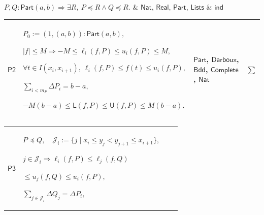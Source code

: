 \documentclass[11pt]{amsart}
\newlength{\FTCFourColumnBody}
\begin{document}
{\begin{tabular}
$\displaystyle P,Q:\textsf{Part}(a,b)\Rightarrow\exists R,\ P\preceq R\land Q\preceq R.$ & \hyperlink{ax:Nat}{$\displaystyle \textsf{Nat}$}, \hyperlink{ax:Real}{$\displaystyle \textsf{Real}$}, \hyperlink{def:Part}{$\displaystyle \textsf{Part}$}, \hyperlink{def:Lists}{$\displaystyle \textsf{Lists}$} & $\displaystyle \textsf{ind}$\\ \hline
\end{tabular}%
\par\setlength{\parskip}{0pt}\nointerlineskip
\noindent
\begin{tabular}{|@{}>{\centering\arraybackslash}m{0.078431\FTCFourColumnBody}|>{\centering\arraybackslash}m{0.535947\FTCFourColumnBody}|>{\centering\arraybackslash}m{0.281045\FTCFourColumnBody}|>{\centering\arraybackslash}m{0.104575\FTCFourColumnBody}|}\hline
\hypertarget{proof:P2}{$\displaystyle \textsf{P2}$} & $\displaystyle P_0:=(1,(a,b)):\textsf{Part}(a,b),$\par
$\displaystyle |f|\le M\Rightarrow -M\le\ell_i(f,P)\le u_i(f,P)\le M,$\par
$\displaystyle \forall t\in I(x_i,x_{i+1}),\ \ell_i(f,P)\le f(t)\le u_i(f,P),$\par
$\displaystyle \sum_{i<m_P}\Delta P_i=b-a,$\par
$\displaystyle -M(b-a)\le\textsf{L}(f,P)\le\textsf{U}(f,P)\le M(b-a).$ & \hyperlink{def:Part}{$\displaystyle \textsf{Part}$}, \hyperlink{def:Darboux}{$\displaystyle \textsf{Darboux}$}, \hyperlink{def:Bdd}{$\displaystyle \textsf{Bdd}$}, \hyperlink{ax:Complete}{$\displaystyle \textsf{Complete}$}, \hyperlink{ax:Nat}{$\displaystyle \textsf{Nat}$} & $\displaystyle \sum$\\ \hline
\end{tabular}%
\par\setlength{\parskip}{0pt}\nointerlineskip
\noindent
\begin{tabular}{|@{}>{\centering\arraybackslash}m{0.078431\FTCFourColumnBody}|>{\centering\arraybackslash}m{0.535947\FTCFourColumnBody}|>{\centering\arraybackslash}m{0.281045\FTCFourColumnBody}|>{\centering\arraybackslash}m{0.104575\FTCFourColumnBody}|}\hline
\hypertarget{proof:P3}{$\displaystyle \textsf{P3}$} & $\displaystyle P\preceq Q,\quad\mathcal J_i:=\{j\mid x_i\le y_j<y_{j+1}\le x_{i+1}\},$\par
$\displaystyle j\in\mathcal J_i\Rightarrow\ell_i(f,P)\le\ell_j(f,Q)$\par
$\displaystyle {}\le u_j(f,Q)\le u_i(f,P),$\par
$\displaystyle \sum_{j\in\mathcal J_i}\Delta Q_j=\Delta P_i,$\par

\end{tabular}}
\end{document}
